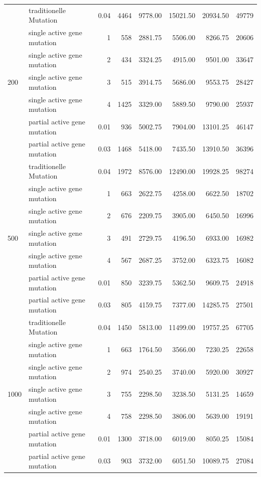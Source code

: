 \begin{table}[!ht]
{\begin{tabular}{ |l|l|r||r|r|r|r|r|}
  \multirow{ 7 }{*}{200}
   & traditionelle Mutation & 0.04 & 4464 & 9778.00 & 15021.50 & 20934.50 & 49779 \\
   & single active gene mutation & 1 &  558 & 2881.75 & 5506.00 & 8266.75 & 20606 \\ 
   & single active gene mutation & 2 & 434 & 3324.25 & 4915.00 & 9501.00 & 33647 \\
   & single active gene mutation & 3 & 515 & 3914.75 & 5686.00 & 9553.75 & 28427 \\
   & single active gene mutation & 4 & 1425 & 3329.00 & 5889.50 & 9790.00 & 25937 \\
   & partial active gene mutation & 0.01 & 936 & 5002.75 & 7904.00 & 13101.25 & 46147 \\
   & partial active gene mutation & 0.03 & 1468 & 5418.00 & 7435.50 & 13910.50 & 36396 \\
      \hline
   
  \multirow{ 7 }{*}{500}
   & traditionelle Mutation & 0.04 & 1972 & 8576.00 & 12490.00 & 19928.25 & 98274 \\
   & single active gene mutation & 1 &  663 & 2622.75 & 4258.00 & 6622.50 & 18702 \\ 
   & single active gene mutation & 2 & 676 & 2209.75 & 3905.00 & 6450.50 & 16996 \\
   & single active gene mutation & 3 & 491 & 2729.75 & 4196.50 & 6933.00 & 16982 \\
   & single active gene mutation & 4 & 567 & 2687.25 & 3752.00 & 6323.75 & 16082 \\
   & partial active gene mutation & 0.01 & 850 & 3239.75 & 5362.50 & 9609.75 & 24918 \\
   & partial active gene mutation & 0.03 & 805 & 4159.75 & 7377.00 & 14285.75 & 27501 \\
      \hline
    
  \multirow{ 7 }{*}{1000} 
   & traditionelle Mutation & 0.04 & 1450 & 5813.00 & 11499.00 & 19757.25 & 67705 \\
   & single active gene mutation & 1 &  663 & 1764.50 & 3566.00 & 7230.25 & 22658 \\ 
   & single active gene mutation & 2 & 974 & 2540.25 & 3740.00 & 5920.00 & 30927 \\
   & single active gene mutation & 3 & 755 & 2298.50 & 3238.50 & 5131.25 & 14659 \\
   & single active gene mutation & 4 & 758 & 2298.50 & 3806.00 & 5639.00 & 19191 \\
   & partial active gene mutation & 0.01 & 1300 & 3718.00 & 6019.00 & 8050.25 & 15084 \\
   & partial active gene mutation & 0.03 & 903 & 3732.00 & 6051.50 & 10089.75 & 27084 \\
      \hline

\end{tabular}
}
\label{table_meta3}
\end{table}


